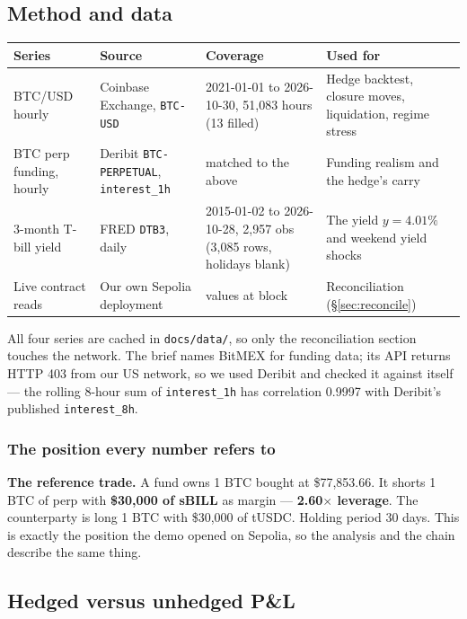 \documentclass[11pt,a4paper]{article}
\newcommand{\note}[1]{{\small\color{muted}#1}}
\newcommand{\cbox}[1]{%
  \begin{center}\colorbox{panel}{\parbox{0.95\textwidth}{\vspace{3pt}#1\vspace{3pt}}}\end{center}}
\begin{document}
\subsection{Method and data}

\begin{center}
\small
\begin{tabular}{@{}p{3.4cm}p{3.2cm}p{3.0cm}p{5.4cm}@{}}
\toprule
\textbf{Series} & \textbf{Source} & \textbf{Coverage} & \textbf{Used for} \\
\midrule
BTC/USD hourly & Coinbase Exchange, \texttt{BTC-USD} & 2021-01-01 to 2026-10-30, 51,083 hours (13 filled) & Hedge backtest, closure moves, liquidation, regime stress \\
BTC perp funding, hourly & Deribit \texttt{BTC-PERPETUAL}, \texttt{interest\_1h} & matched to the above & Funding realism and the hedge's carry \\
3-month T-bill yield & FRED \texttt{DTB3}, daily & 2015-01-02 to 2026-10-28, 2,957 obs (3,085 rows, holidays blank) & The yield $y=4.01\%$ and weekend yield shocks \\
Live contract reads & Our own Sepolia deployment & \reconCount{} values at block \reconBlock{} & Reconciliation (\S\ref{sec:reconcile}) \\
\bottomrule
\end{tabular}
\end{center}

\note{All four series are cached in \texttt{docs/data/}, so only the reconciliation section touches
the network. The brief names BitMEX for funding data; its API returns HTTP 403 from our US network,
so we used Deribit and checked it against itself — the rolling 8-hour sum of \texttt{interest\_1h}
has correlation 0.9997 with Deribit's published \texttt{interest\_8h}.}

\subsubsection*{The position every number refers to}

\cbox{\textbf{The reference trade.} A fund owns 1 BTC bought at \$77,853.66. It shorts 1 BTC of perp
with \textbf{\$30,000 of sBILL} as margin — \textbf{2.60$\times$ leverage}. The counterparty is long
1 BTC with \$30,000 of tUSDC. Holding period 30 days. This is exactly the position the demo opened on
Sepolia, so the analysis and the chain describe the same thing.}

\subsection{Hedged versus unhedged P\&L}\label{sec:hedged}
\end{document}

